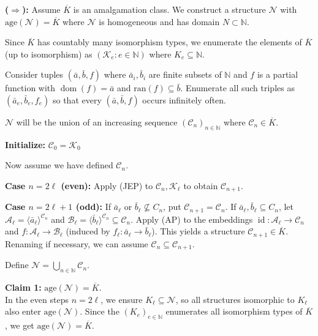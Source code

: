 \documentclass[
]{article}
\theoremstyle{definition}
\theoremstyle{definition}
\theoremstyle{plain}
\theoremstyle{remark}
\begin{document}
\textbf{(\(\Rightarrow\)):} Assume \(\overline{K}\) is an amalgamation
class. We construct a structure \(\mathcal{N}\) with
\(\text{age}(\mathcal{N}) = \overline{K}\) where \(\mathcal{N}\) is
homogeneous and has domain \(N \subset \mathbb{N}\).

Since \(\overline{K}\) has countably many isomorphism types, we
enumerate the elements of \(\overline{K}\) (up to isomorphism) as
\((\mathcal{K}_e: e \in \mathbb{N})\) where
\(K_e \subseteq \mathbb{N}\).

Consider tuples \((\bar{a}, \bar{b}, f)\) where \(\bar{a}_i, \bar{b}_i\)
are finite subsets of \(\mathbb{N}\) and \(f\) is a partial function
with \(\operatorname{dom}(f) = \bar{a}\) and
\(\text{ran}(f) \subseteq \bar{b}\). Enumerate all such triples as
\((\bar{a}_e, \bar{b}_e, f_e)\) so that every \((\bar{a}, \bar{b}, f)\)
occurs infinitely often.

\(\mathcal{N}\) will be the union of an increasing sequence
\((\mathcal{C}_n)_{n \in \mathbb{N}}\) where
\(\mathcal{C}_n \in \overline{K}\).

\textbf{Initialize:} \(\mathcal{C}_0 = \mathcal{K}_0\)

Now assume we have defined \(\mathcal{C}_n\).

\textbf{Case \(n = 2\ell\) (even):} Apply (JEP) to
\(\mathcal{C}_n, \mathcal{K}_\ell\) to obtain \(\mathcal{C}_{n+1}\).

\textbf{Case \(n = 2\ell + 1\) (odd):} If \(\bar{a}_\ell\) or
\(\bar{b}_\ell \nsubseteq C_n\), put
\(\mathcal{C}_{n+1} = \mathcal{C}_n\). If
\(\bar{a}_\ell, \bar{b}_\ell \subseteq C_n\), let
\(\mathcal{A}_\ell = \langle \bar{a}_\ell \rangle^{\mathcal{C}_n}\) and
\(\mathcal{B}_\ell = \langle \bar{b}_\ell \rangle^{\mathcal{C}_n} \subseteq \mathcal{C}_n\).
Apply (AP) to the embeddings
\(\operatorname{id}: \mathcal{A}_\ell \to \mathcal{C}_n\) and
\(f: \mathcal{A}_\ell \to \mathcal{B}_\ell\) (induced by
\(f_\ell: \bar{a}_\ell \to \bar{b}_\ell\)). This yields a structure
\(\mathcal{C}_{n+1} \in \overline{K}\). Renaming if necessary, we can
assume \(\mathcal{C}_n \subseteq \mathcal{C}_{n+1}\).

Define \(\mathcal{N} = \bigcup_{n \in \mathbb{N}} \mathcal{C}_n\).

\textbf{Claim 1:} \(\text{age}(\mathcal{N}) = \overline{K}\).\\
In the even steps \(n = 2\ell\), we ensure
\(K_\ell \subseteq \mathcal{N}\), so all structures isomorphic to
\(K_\ell\) also enter \(\text{age}(\mathcal{N})\). Since the
\((K_e)_{e \in \mathbb{N}}\) enumerates all isomorphism types of
\(\overline{K}\), we get \(\text{age}(\mathcal{N}) = \overline{K}\).
\end{document}
